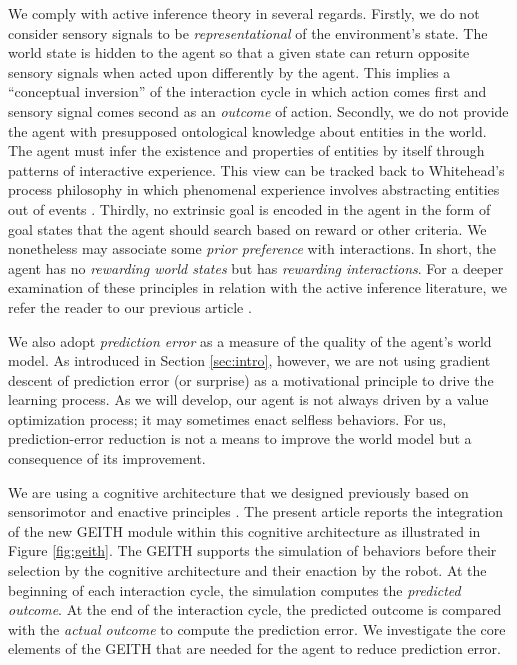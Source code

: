 \documentclass[runningheads]{llncs}
\begin{document}
We comply with active inference theory in several regards. 
Firstly, we do not consider sensory signals to be \textit{representational} of the environment's state. 
The world state is hidden to the agent so that a given state can return opposite sensory signals when acted upon differently by the agent.
This implies a ``conceptual inversion'' of the interaction cycle in which action comes first and sensory signal comes second as an  \textit{outcome} of action. 
Secondly, we do not provide the agent with presupposed ontological knowledge about entities in the world. 
The agent must infer the existence and properties of entities by itself through patterns of interactive experience. 
This view can be tracked back to Whitehead's process philosophy in which phenomenal experience involves abstracting entities out of events \cite{whitehead1929}. 
Thirdly, no extrinsic goal is encoded in the agent in the form of goal states that the agent should search based on reward or other criteria. 
We nonetheless may associate some \textit{prior preference} with interactions. 
In short, the agent has no \textit{rewarding world states} but has \textit{rewarding interactions}. %
For a deeper examination of these principles in relation with the active inference literature, we refer the reader to our previous article \cite{georgeon_artificial_2024}.

We also adopt \textit{prediction error} as a measure of the quality of the agent's world model. %
As introduced in Section \ref{sec:intro}, however, we are not using gradient descent of prediction error (or surprise) as a motivational principle to drive the learning process. 
As we will develop, our agent is not always driven by a value optimization process; it may sometimes enact selfless behaviors.
For us, prediction-error reduction is not a means to improve the world model but a consequence of its improvement.

We are using a cognitive architecture that we designed previously based on sensorimotor and enactive principles \cite{georgeon_artificial_2024}. 
The present article reports the integration of the new GEITH module within this cognitive architecture as illustrated in Figure \ref{fig:geith}. 
The GEITH supports the simulation of behaviors before their selection by the cognitive architecture and their enaction by the robot. 
At the beginning of each interaction cycle, the simulation computes the \textit{predicted outcome}.
At the end of the interaction cycle, the predicted outcome is compared with the \textit{actual outcome} to compute the prediction error.   
We investigate the core elements of the GEITH that are needed for the agent to reduce prediction error. 
\end{document}
